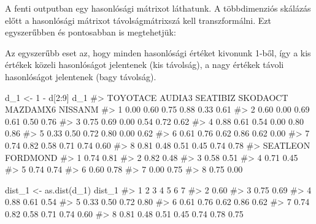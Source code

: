 \documentclass[
  letterpaper,
]{krantz}
\makeatletter
\newenvironment{Shaded}{\begin{snugshade}}{\end{snugshade}}
\newcommand{\CommentTok}[1]{\textcolor[rgb]{0.37,0.37,0.37}{#1}}
\newcommand{\DecValTok}[1]{\textcolor[rgb]{0.68,0.00,0.00}{#1}}
\newcommand{\FunctionTok}[1]{\textcolor[rgb]{0.28,0.35,0.67}{#1}}
\newcommand{\NormalTok}[1]{\textcolor[rgb]{0.00,0.23,0.31}{#1}}
\newcommand{\OtherTok}[1]{\textcolor[rgb]{0.00,0.23,0.31}{#1}}
\newcommand{\SpecialCharTok}[1]{\textcolor[rgb]{0.37,0.37,0.37}{#1}}
\newenvironment{kframe}{%
\medskip{}
\setlength{\fboxsep}{.8em}
 \def\at@end@of@kframe{}%
 \ifinner\ifhmode%
  \def\at@end@of@kframe{\end{minipage}}%
  \begin{minipage}{\columnwidth}%
 \fi\fi%
 \def\FrameCommand##1{\hskip\@totalleftmargin \hskip-\fboxsep
 \colorbox{shadecolor}{##1}\hskip-\fboxsep
     \hskip-\linewidth \hskip-\@totalleftmargin \hskip\columnwidth}%
 \MakeFramed {\advance\hsize-\width
   \@totalleftmargin\z@ \linewidth\hsize
   \@setminipage}}%
 {\par\unskip\endMakeFramed%
 \at@end@of@kframe}
\renewenvironment{Shaded}{\begin{kframe}}{\end{kframe}}
\makeatother
\begin{document}
A fenti outputban egy hasonlósági mátrixot láthatunk. A többdimenziós
skálázás előtt a hasonlósági mátrixot távolságmátrixszá kell
transzformálni. Ezt egyszerűbben és pontosabban is megtehetjük:

Az egyszerűbb eset az, hogy minden hasonlósági értéket kivonunk 1-ből,
így a kis értékek közeli hasonlóságot jelentenek (kis távolság), a nagy
értékek távoli hasonlóságot jelentenek (bagy távolság).

\begin{Shaded}
\begin{Highlighting}[]
\NormalTok{d\_1 }\OtherTok{\textless{}{-}} \DecValTok{1} \SpecialCharTok{{-}}\NormalTok{ d[}\DecValTok{2}\SpecialCharTok{:}\DecValTok{9}\NormalTok{]}
\NormalTok{d\_1}
\CommentTok{\#\textgreater{}   TOYOTACE AUDIA3 SEATIBIZ SKODAOCT MAZDAMX6 NISSANM}
\CommentTok{\#\textgreater{} 1     0.00   0.60     0.75     0.88     0.33    0.61}
\CommentTok{\#\textgreater{} 2     0.60   0.00     0.69     0.61     0.50    0.76}
\CommentTok{\#\textgreater{} 3     0.75   0.69     0.00     0.54     0.72    0.62}
\CommentTok{\#\textgreater{} 4     0.88   0.61     0.54     0.00     0.80    0.86}
\CommentTok{\#\textgreater{} 5     0.33   0.50     0.72     0.80     0.00    0.62}
\CommentTok{\#\textgreater{} 6     0.61   0.76     0.62     0.86     0.62    0.00}
\CommentTok{\#\textgreater{} 7     0.74   0.82     0.58     0.71     0.74    0.60}
\CommentTok{\#\textgreater{} 8     0.81   0.48     0.51     0.45     0.74    0.78}
\CommentTok{\#\textgreater{}   SEATLEON FORDMOND}
\CommentTok{\#\textgreater{} 1     0.74     0.81}
\CommentTok{\#\textgreater{} 2     0.82     0.48}
\CommentTok{\#\textgreater{} 3     0.58     0.51}
\CommentTok{\#\textgreater{} 4     0.71     0.45}
\CommentTok{\#\textgreater{} 5     0.74     0.74}
\CommentTok{\#\textgreater{} 6     0.60     0.78}
\CommentTok{\#\textgreater{} 7     0.00     0.75}
\CommentTok{\#\textgreater{} 8     0.75     0.00}
\end{Highlighting}
\end{Shaded}

\begin{Shaded}
\begin{Highlighting}[]
\NormalTok{dist\_1 }\OtherTok{\textless{}{-}} \FunctionTok{as.dist}\NormalTok{(d\_1)}
\NormalTok{dist\_1}
\CommentTok{\#\textgreater{}      1    2    3    4    5    6    7}
\CommentTok{\#\textgreater{} 2 0.60                              }
\CommentTok{\#\textgreater{} 3 0.75 0.69                         }
\CommentTok{\#\textgreater{} 4 0.88 0.61 0.54                    }
\CommentTok{\#\textgreater{} 5 0.33 0.50 0.72 0.80               }
\CommentTok{\#\textgreater{} 6 0.61 0.76 0.62 0.86 0.62          }
\CommentTok{\#\textgreater{} 7 0.74 0.82 0.58 0.71 0.74 0.60     }
\CommentTok{\#\textgreater{} 8 0.81 0.48 0.51 0.45 0.74 0.78 0.75}
\end{Highlighting}
\end{Shaded}
\end{document}

